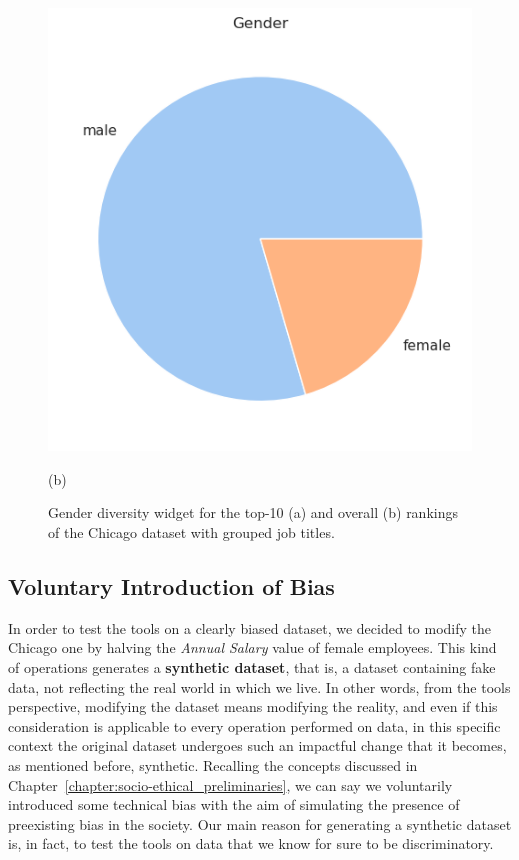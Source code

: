 \begin{itemize}
\begin{itemize}
\begin{figure}[t!]
\begin{minipage}{0.45\textwidth}
\includegraphics[width=\textwidth]{figures/chicago_grouped_rankingfacts1b.png}
\caption*{(b)}
\end{minipage}
\caption{\textrm{Gender} diversity widget for the top-10 (a) and overall (b) rankings of the Chicago dataset with grouped job titles.}
\label{fig:chicago_grouped_rankingfacts}
\end{figure}

\end{itemize}
\end{itemize}


\subsection{Voluntary Introduction of Bias}
\label{section:voluntary_introduction_of_bias}
In order to test the tools on a clearly biased dataset, we decided to modify the Chicago one by halving the \textit{Annual Salary} value of female employees. This kind of operations generates a \textbf{synthetic dataset}, that is, a dataset containing fake data, not reflecting the real world in which we live. In other words, from the tools perspective, modifying the dataset means modifying the reality, and even if this consideration is applicable to every operation performed on data, in this specific context the original dataset undergoes such an impactful change that it becomes, as mentioned before, synthetic. Recalling the concepts discussed in Chapter~\ref{chapter:socio-ethical_preliminaries}, we can say we voluntarily introduced some technical bias with the aim of simulating the presence of preexisting bias in the society. Our main reason for generating a synthetic dataset is, in fact, to test the tools on data that we know for sure to be discriminatory.

